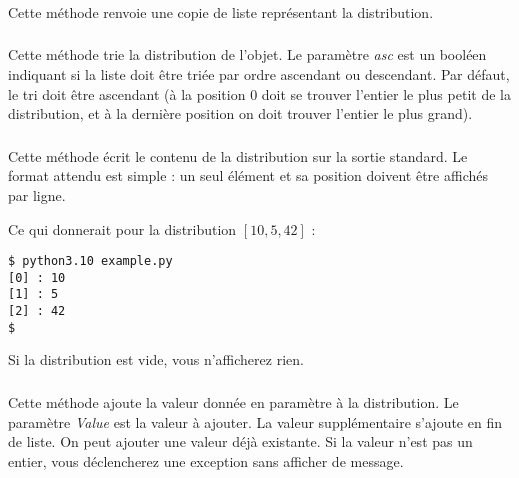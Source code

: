 \subsubsection*{}

\noindent Cette méthode renvoie une copie de liste représentant la distribution.


\subsubsection*{}

\noindent Cette méthode trie la distribution de l'objet.
Le paramètre \textit{asc} est un booléen indiquant si la liste doit être triée par ordre ascendant ou descendant.
Par défaut, le tri doit être ascendant (à la position $ 0 $ doit se trouver l'entier le plus petit de la distribution, et à la dernière position on doit trouver l'entier le plus grand).


\subsubsection*{}

\noindent Cette méthode écrit le contenu de la distribution sur la sortie standard.
Le format attendu est simple : un seul élément et sa position doivent être affichés par ligne.

\bigskip

\noindent {}

\bigskip

\noindent Ce qui donnerait pour la distribution $ [ 10, 5, 42 ] $ :

\lstset{language=sh}
\begin{lstlisting}[frame=single]
$ python3.10 example.py
[0] : 10
[1] : 5
[2] : 42
$
\end{lstlisting}

\bigskip

\noindent Si la distribution est vide, vous n'afficherez rien.



\subsubsection*{}

\noindent Cette méthode ajoute la valeur donnée en paramètre à la distribution.
Le paramètre \textit{Value} est la valeur à ajouter.
La valeur supplémentaire s'ajoute en fin de liste.
On peut ajouter une valeur déjà existante.
Si la valeur n'est pas un entier, vous déclencherez une exception  sans afficher de message.

